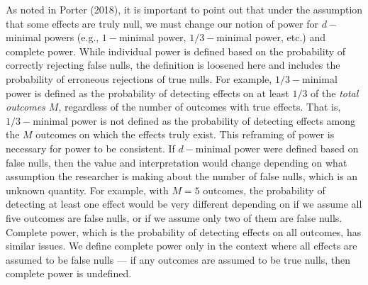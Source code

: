 \documentclass[
]{article}
\begin{document}
As noted in Porter (2018), it is important to point out that under the
assumption that some effects are truly null, we must change our notion
of power for \(d-\)minimal powers (e.g., \(1-\)minimal power,
\(1/3-\)minimal power, etc.) and complete power. While individual power
is defined based on the probability of correctly rejecting false nulls,
the definition is loosened here and includes the probability of
erroneous rejections of true nulls. For example, \(1/3-\)minimal power
is defined as the probability of detecting effects on at least \(1/3\)
of the \emph{total outcomes \(M\)}, regardless of the number of outcomes
with true effects. That is, \(1/3-\)minimal power is not defined as the
probability of detecting effects among the \(M\) outcomes on which the
effects truly exist. This reframing of power is necessary for power to
be consistent. If \(d-\)minimal power were defined based on false nulls,
then the value and interpretation would change depending on what
assumption the researcher is making about the number of false nulls,
which is an unknown quantity. For example, with \(M = 5\) outcomes, the
probability of detecting at least one effect would be very different
depending on if we assume all five outcomes are false nulls, or if we
assume only two of them are false nulls. Complete power, which is the
probability of detecting effects on all outcomes, has similar issues. We
define complete power only in the context where all effects are assumed
to be false nulls --- if any outcomes are assumed to be true nulls, then
complete power is undefined.
\end{document}
